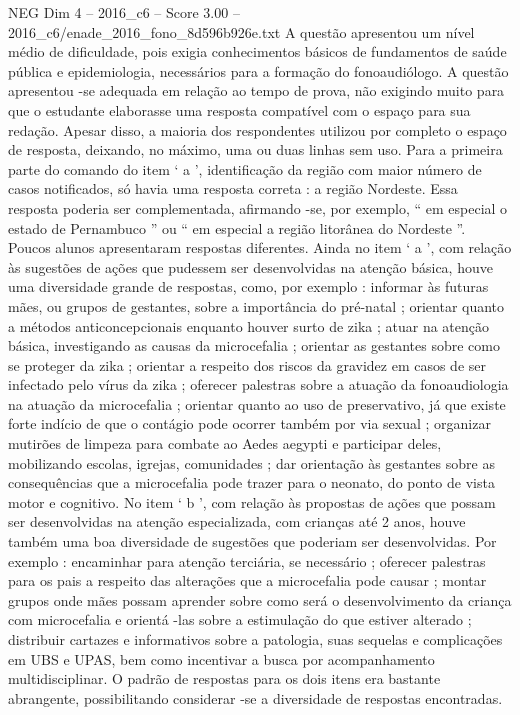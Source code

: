 \begin{textsample}{NEG Dim 4 – 2016\_c6 – Score 3.00 – 2016\_c6/enade\_2016\_fono\_8d596b926e.txt}
A questão apresentou um nível médio de dificuldade, pois exigia conhecimentos básicos de fundamentos de saúde pública e epidemiologia, necessários para a formação do fonoaudiólogo.
A questão apresentou -se adequada em relação ao tempo de prova, não exigindo muito para que o estudante elaborasse uma resposta compatível com o espaço para sua redação.
Apesar disso, a maioria dos respondentes utilizou por completo o espaço de resposta, deixando, no máximo, uma ou duas linhas sem uso.
Para a primeira parte do comando do item ‘ a ’, identificação da região com maior número de casos notificados, só havia uma resposta correta : a região Nordeste.
Essa resposta poderia ser complementada, afirmando -se, por exemplo, “ em especial o estado de Pernambuco ” ou “ em especial a região litorânea do Nordeste ”.
Poucos alunos apresentaram respostas diferentes.
Ainda no item ‘ a ’, com relação às sugestões de ações que pudessem ser desenvolvidas na atenção básica, houve uma diversidade grande de respostas, como, por exemplo : informar às futuras mães, ou grupos de gestantes, sobre a importância do pré-natal ; orientar quanto a métodos anticoncepcionais enquanto houver surto de zika ; atuar na atenção básica, investigando as causas da microcefalia ; orientar as gestantes sobre como se proteger da zika ; orientar a respeito dos riscos da gravidez em casos de ser infectado pelo vírus da zika ; oferecer palestras sobre a atuação da fonoaudiologia na atuação da microcefalia ; orientar quanto ao uso de preservativo, já que existe forte indício de que o contágio pode ocorrer também por via sexual ; organizar mutirões de limpeza para combate ao Aedes aegypti e participar deles, mobilizando escolas, igrejas, comunidades ; dar orientação às gestantes sobre as consequências que a microcefalia pode trazer para o neonato, do ponto de vista motor e cognitivo.
No item ‘ b ’, com relação às propostas de ações que possam ser desenvolvidas na atenção especializada, com crianças até 2 anos, houve também uma boa diversidade de sugestões que poderiam ser desenvolvidas.
Por exemplo : encaminhar para atenção terciária, se necessário ; oferecer palestras para os pais a respeito das alterações que a microcefalia pode causar ; montar grupos onde mães possam aprender sobre como será o desenvolvimento da criança com microcefalia e orientá -las sobre a estimulação do que estiver alterado ; distribuir cartazes e informativos sobre a patologia, suas sequelas e complicações em UBS e UPAS, bem como incentivar a busca por acompanhamento multidisciplinar.
O padrão de respostas para os dois itens era bastante abrangente, possibilitando considerar -se a diversidade de respostas encontradas.

\end{textsample}
